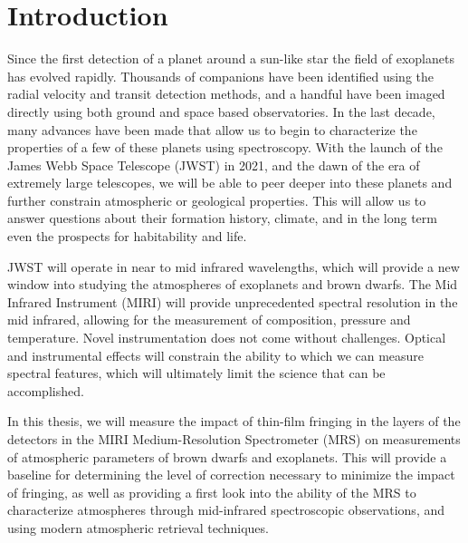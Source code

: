 \newcommand{\bpic}{$\beta$ Pic b }
\newcommand{\mj}{M$_{j}$}
\chapter{Introduction}
Since the first detection of a planet around a sun-like star \parencite{Mayor1995} the field of exoplanets has evolved rapidly.
Thousands of companions have been identified using the radial velocity and transit detection methods, and a handful have been imaged directly using both ground and space based observatories.
In the last decade, many advances have been made that allow us to begin to characterize the properties of a few of these planets using spectroscopy.
With the launch of the James Webb Space Telescope (JWST) in 2021, and the dawn of the era of extremely large telescopes, we will be able to peer deeper into these planets and further constrain atmospheric or geological properties. 
This will allow us to answer questions about their formation history, climate, and in the long term even the prospects for habitability and life.

JWST will operate in near to mid infrared wavelengths, which will provide a new window into studying the atmospheres of exoplanets and brown dwarfs. 
The Mid Infrared Instrument (MIRI) will provide unprecedented spectral resolution in the mid infrared, allowing for the measurement of composition, pressure and temperature. 
Novel instrumentation does not come without challenges. 
Optical and instrumental effects will constrain the ability to which we can measure spectral features, which will ultimately limit the science that can be accomplished.

In this thesis, we will measure the impact of thin-film fringing in the layers of the detectors in the MIRI Medium-Resolution Spectrometer (MRS) on measurements of atmospheric parameters of brown dwarfs and exoplanets.
This will provide a baseline for determining the level of correction necessary to minimize the impact of fringing, as well as providing a first look into the ability of the MRS to characterize atmospheres through mid-infrared spectroscopic observations, and using modern atmospheric retrieval techniques.

